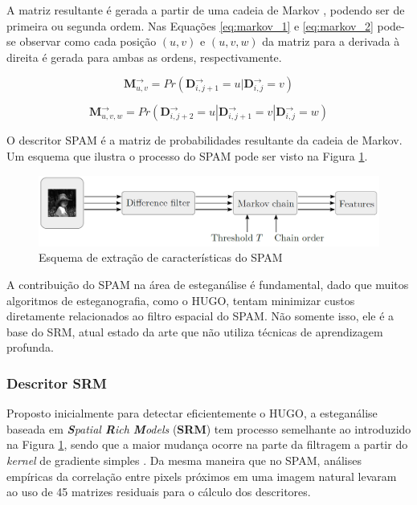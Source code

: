 A matriz resultante é gerada a partir de uma cadeia de Markov \cite{lipschutz1998schaum}, podendo ser de primeira ou segunda ordem. Nas Equações \ref{eq:markov_1} e \ref{eq:markov_2}
 pode-se observar como cada posição $(u, v)$ e $(u, v, w)$ da matriz para a derivada à direita é gerada para ambas as ordens, respectivamente.
 
\begin{equation}
	\label{eq:markov_1}
    \textbf{M}^{\rightarrow}_{u,v} = Pr(\textbf{D}^{\rightarrow}_{i,j+1} = u | \textbf{D}^{\rightarrow}_{i,j} = v)
\end{equation}
 
\begin{equation}
	\label{eq:markov_2}
    \textbf{M}^{\rightarrow}_{u,v, w} = Pr(\textbf{D}^{\rightarrow}_{i,j+2} = u | \textbf{D}^{\rightarrow}_{i,j+1} = v |\textbf{D}^{\rightarrow}_{i,j} = w) 
\end{equation}
 
O descritor SPAM é a matriz de probabilidades resultante da cadeia de Markov. Um esquema que ilustra o processo do SPAM pode ser visto na Figura \ref{fig:spam2}.

\begin{figure}[!htb]
	\centering
    \includegraphics[width=.9\textwidth]{dados/figuras/SPAM2.png}
    \caption{Esquema de extração de características do SPAM \cite{spam}}
    \label{fig:spam2}
\end{figure}

A contribuição do SPAM na área de esteganálise é fundamental, dado que muitos algoritmos de esteganografia, como o HUGO, tentam minimizar custos diretamente relacionados ao filtro espacial do SPAM. Não somente isso, ele é a base do SRM, atual estado da arte que não utiliza técnicas de aprendizagem profunda.

\subsubsection{Descritor SRM}
\label{subsec:srm}

Proposto inicialmente para detectar eficientemente o HUGO, a esteganálise baseada em \textit{\textbf{S}patial \textbf{R}ich \textbf{M}odels} (\textbf{SRM}) tem processo semelhante ao introduzido na Figura \ref{fig:spam2}, sendo que a maior mudança ocorre na parte da filtragem a partir do \textit{kernel} de gradiente simples \cite{fridrich2012rich}. Da mesma maneira que no SPAM, análises empíricas da correlação entre pixels próximos em uma imagem natural levaram ao uso  de 45 matrizes residuais para o cálculo dos descritores.

